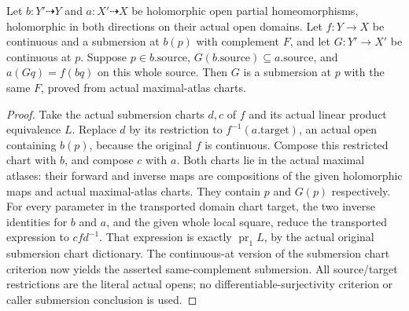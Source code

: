 \begin{lemma}
\label{hir:submersion-blowup-local-biholomorphic-chart-transport}
\leanok
{}
\uses{}
Let $b:Y'\dashrightarrow Y$ and $a:X'\dashrightarrow X$ be holomorphic open
partial homeomorphisms, holomorphic in both directions on their actual open
domains. Let $f:Y\to X$ be continuous and a submersion at $b(p)$ with complement $F$, and
let $G:Y'\to X'$ be continuous at $p$. Suppose $p\in b.\mathrm{source}$,
$G(b.\mathrm{source})\subseteq a.\mathrm{source}$, and
$a(Gq)=f(bq)$ on this whole source. Then $G$ is a submersion at $p$ with the
same $F$, proved from actual maximal-atlas charts.
\end{lemma}
\begin{proof}
Take the actual submersion charts $d,c$ of $f$ and its actual linear product
equivalence $L$. Replace $d$ by its restriction to $f^{-1}(a.\mathrm{target})$,
an actual open containing $b(p)$, because the original $f$ is continuous. Compose this restricted chart with $b$, and compose $c$ with $a$.
Both charts lie in the actual maximal atlases: their forward and inverse maps
are compositions of the given holomorphic maps and actual maximal-atlas charts.
They contain $p$ and $G(p)$ respectively. For every parameter in the transported
domain chart target, the two inverse identities for $b$ and $a$, and the given
whole local square, reduce the transported expression to $c f d^{-1}$.
That expression is exactly $\operatorname{pr}_1 L$, by the actual original
submersion chart dictionary. The continuous-at version of the submersion chart
criterion now yields the asserted same-complement submersion. All source/target
restrictions are the literal actual opens; no differentiable-surjectivity
criterion or caller submersion conclusion is used.
\end{proof}

